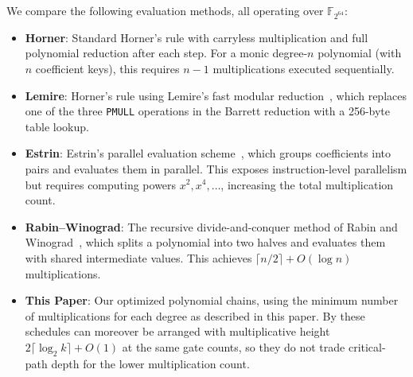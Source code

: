 We compare the following evaluation methods, all operating over $\mathbb{F}_{2^{64}}$:
\begin{itemize}
    \item \textbf{Horner}: Standard Horner's rule with carryless multiplication
          and full polynomial reduction after each step.
          For a monic degree-$n$ polynomial (with $n$ coefficient keys), this requires $n-1$ multiplications
          executed sequentially.
    \item \textbf{Lemire}: Horner's rule using Lemire's fast modular reduction~\cite[\S4.4]{lemire2015clhash},
          which replaces one of the three \texttt{PMULL} operations in the Barrett reduction
          with a 256-byte table lookup.
    \item \textbf{Estrin}: Estrin's parallel evaluation scheme~\cite{estrin1960organization},
          which groups coefficients into pairs and evaluates them in parallel.
          This exposes instruction-level parallelism but requires computing powers
          $x^2, x^4, \ldots$, increasing the total multiplication count.
    \item \textbf{Rabin--Winograd}: The recursive divide-and-conquer method of
          Rabin and Winograd~\cite{rabin1972number}, which splits a polynomial
          into two halves and evaluates them with shared intermediate values.
          This achieves $\lceil n/2 \rceil + O(\log n)$ multiplications.
    \item \textbf{This Paper}: Our optimized polynomial chains,
          using the minimum number of multiplications for each degree
          as described in this paper.  By 
          these schedules can moreover be arranged with multiplicative height
          $2\lceil\log_2 k\rceil+O(1)$ at the same gate counts, so they do not
          trade critical-path depth for the lower multiplication count.
\end{itemize}

